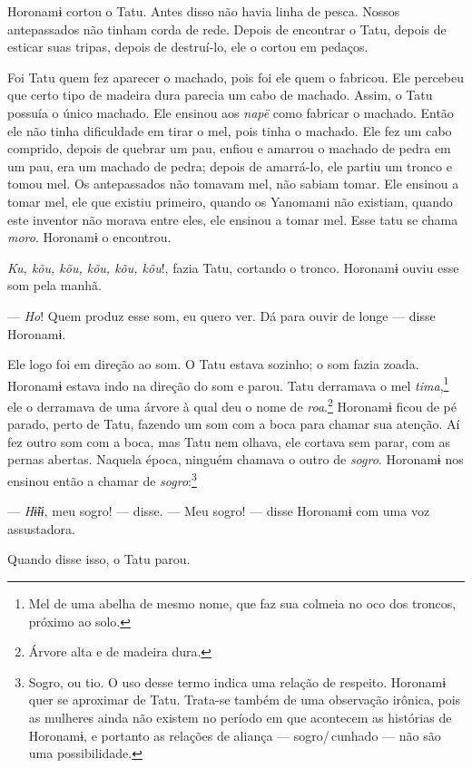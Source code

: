 Horonamɨ cortou o Tatu. Antes disso não havia linha de pesca. Nossos
antepassados não tinham corda de rede. Depois de encontrar o Tatu,
depois de esticar suas tripas, depois de destruí-lo, ele o cortou em
pedaços. 

Foi Tatu quem fez aparecer o machado, pois foi ele quem o fabricou. Ele
percebeu que certo tipo de madeira dura parecia um cabo de machado.
Assim, o Tatu possuía o único machado. Ele ensinou aos \textit{napë} como
fabricar o machado. Então ele não tinha dificuldade em tirar o mel, pois
tinha o machado. Ele fez um cabo comprido, depois de quebrar um pau,
enfiou e amarrou o machado de pedra em um pau, era um machado de pedra;
depois de amarrá-lo, ele partiu um tronco e tomou mel. Os antepassados
não tomavam mel, não sabiam tomar. Ele ensinou a tomar mel, ele que
existiu primeiro, quando os Yanomami não existiam, quando este inventor
não morava entre eles, ele ensinou a tomar mel. Esse tatu se
chama \textit{moro}. Horonamɨ o encontrou. 

\textit{Ku, kõu, kõu, kõu, kõu, kõu}!, fazia Tatu, cortando o tronco.
Horonamɨ ouviu esse som pela manhã. 

--- \textit{Ho}! Quem produz esse som, eu quero ver. Dá para ouvir de longe --- disse
Horonamɨ. 

Ele logo foi em direção ao som. O Tatu estava sozinho; o som fazia
zoada. Horonamɨ estava indo na direção do som e parou. Tatu derramava o
mel \textit{tima},\footnote{Mel de uma abelha de mesmo nome, que faz sua 
colmeia no oco dos troncos, próximo ao solo.} ele o derramava de uma árvore à qual deu o nome
de \textit{roa}.\footnote{Árvore alta e de madeira dura.} Horonamɨ ficou de pé parado, perto de Tatu, fazendo um som com a boca para chamar sua atenção. Aí fez
outro som com a boca, mas Tatu nem olhava, ele cortava sem parar, com as
pernas abertas. Naquela época, ninguém chamava o outro de \textit{sogro}.
Horonamɨ nos ensinou então a chamar de \textit{sogro}:\footnote{Sogro, ou tio. O uso desse termo indica uma relação de respeito. Horonamɨ quer se aproximar de Tatu. Trata-se também de uma observação irônica, pois as mulheres ainda não existem no período em que acontecem as histórias de Horonamɨ, e portanto as relações de aliança --- sogro/\,cunhado --- não são uma possibilidade.}

--- \textit{Hɨ̃ɨɨ}, meu sogro! --- disse. --- Meu sogro! --- disse Horonamɨ com
uma voz assustadora. 

Quando disse isso, o Tatu parou. 

